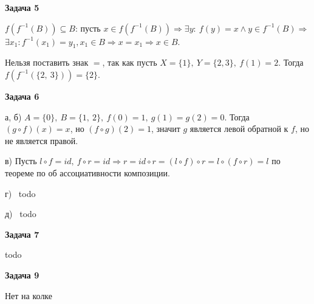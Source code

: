 \begin{center}
\textbf{Задача 5}
\end{center}
$\displaystyle f\left( f^{-1}( B)\right) \subseteq B$: пусть $\displaystyle x\in f\left( f^{-1}( B)\right) \Longrightarrow \exists y:\ f( y) =x\land y\in f^{-1}( B) \Longrightarrow $ $\displaystyle \exists x_{1} :f^{-1}( x_{1}) =y_{1} ,x_{1} \in B\Longrightarrow $$\displaystyle x=x_{1} \Longrightarrow x\in B$.

Нельзя поставить знак $\displaystyle =$, так как пусть $\displaystyle X=\{1\} ,\ Y=\{2,3\} ,\ f( 1) =2$. Тогда $\displaystyle f\left( f^{-1}(\{2,\ 3\})\right) =\{2\}$.

\begin{center}
\textbf{Задача 6}
\end{center}
а, б) $\displaystyle A=\{0\} ,\ B=\{1,\ 2\} ,\ f( 0) =1,\ g( 1) =g( 2) =0$. Тогда $\displaystyle ( g\circ f)( x) =x$, но $\displaystyle ( f\circ g)( 2) =1$, значит $\displaystyle g$ является левой обратной к $\displaystyle f$, но не является правой.

в) Пусть $\displaystyle l\circ f=id,\ f\circ r=id\Longrightarrow r=id\circ r=( l\circ f) \circ r=l\circ ( f\circ r) =l$ по теореме по об ассоциативности композиции.

г) \ todo

д) \ todo

\begin{center}
\textbf{Задача 7}
\end{center}
todo
\begin{center}
\textbf{Задача 9}
\end{center}
Нет на колке